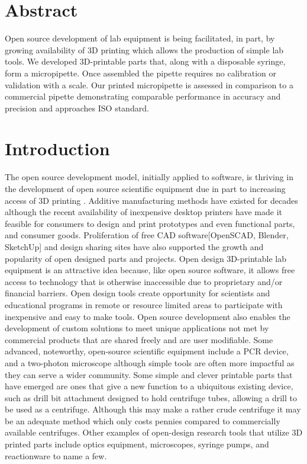 \documentclass[10pt,letterpaper]{article}
\begin{document}
\section*{Abstract}
Open source development of lab equipment is being facilitated, in part, by growing availability of 3D printing which allows the production of simple lab tools.
We developed 3D-printable parts that, along with a disposable syringe, form a micropipette.
Once assembled the pipette requires no calibration or validation with a scale.
Our printed micropipette is assessed in comparison to a commercial pipette demonstrating comparable performance in accuracy and precision and approaches ISO standard.

\linenumbers

\section*{Introduction}
The open source development model, initially applied to software, is thriving in the development of open source scientific equipment due in part to increasing access of 3D printing \cite{Baden2015,Pearce2014}.
Additive manufacturing methods have existed for decades although the recent availability of inexpensive desktop printers\cite{MakerbotIndustries2016,Reprap2015} have made it feasible for consumers to design and print prototypes and even functional parts, and consumer goods\cite{Fullerton2014}.
Proliferation of free CAD software[OpenSCAD, Blender, SketchUp] and design sharing sites\cite{MakerbotIndustries2016,NationalInstitutesofHealth2015,grabCAD,GitHubInc.2016} have also supported the growth and popularity of open designed parts and projects.
Open design 3D-printable lab equipment is an attractive idea because, like open source software, it allows free access to technology that is otherwise inaccessible due to proprietary and/or financial barriers. 
Open design tools create opportunity for scientists and educational programs in remote or resource limited areas to participate with inexpensive and easy to make tools\cite{Baden2015}. 
Open source development also enables the development of custom solutions to meet unique applications not met by commercial products that are shared freely and are user modifiable\cite{Fullerton2014,Pearce2012}.
Some advanced, noteworthy, open-source scientific equipment include a PCR device\cite{ChaiBiotechnologiesInc2015}, and a two-photon microscope\cite{Rosenegger2014} although simple tools are often more impactful as they can serve a wider community.
Some simple and clever printable parts that have emerged are ones that give a new function to a ubiquitous existing device, such as drill bit attachment designed to hold centrifuge tubes, allowing a drill to be used as a centrifuge\cite{Garvey2009}.
Although this may make a rather crude centrifuge it may be an adequate method which only costs pennies compared to commercially available centrifuges.
Other examples of open-design research tools that utilize 3D printed parts include optics equipment\cite{Zhang2013}, microscopes\cite{Baden2014a,Walus2014}, syringe pumps\cite{Wijnen2014}, and reactionware\cite{Symes2012} to name a few.
\end{document}
